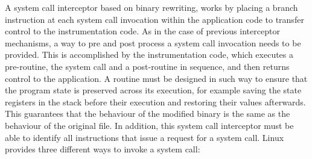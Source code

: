 A system call interceptor based on binary rewriting, works by placing a branch instruction at each system call invocation within the application code to transfer control to the instrumentation code. As in the case of previous interceptor mechanisms, a way to pre and post process a system call invocation needs to be provided. This is accomplished by the instrumentation code, which executes a pre-routine, the system call and a post-routine in sequence, and then returns control to the application. A routine must be designed in such way to ensure that the program state is preserved across its execution, for example saving the state registers in the stack before their execution and restoring their values afterwards. This guarantees that the behaviour of the modified binary is the same as the behaviour of the original file.  In addition, this system call interceptor must be able to identify all instructions that issue a request for a system call. Linux provides three different ways to invoke a system call:

